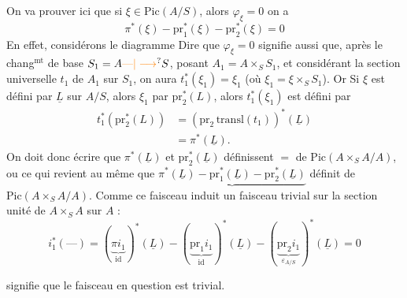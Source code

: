  On va prouver ici que si $\xi\in\mathrm{Pic}(A/S)$, alors $\varphi_\xi=0$  on a
\[
\pi^*(\xi)-\mathrm{pr}_1^*(\xi)-\mathrm{pr}_2^*(\xi)=0
\]
En effet, considérons le diagramme
Dire que $\varphi_\xi=0$ signifie aussi que, après le chang$^{\mathrm{mt}}$ de base   $S_1=A\unsure{\text{---}|\longrightarrow} S$, posant $A_1=A\times_S S_1$, et considérant la section universelle $t_1$ de $A_1$ sur $S_1$, on aura $t_1^*(\xi_1)=\xi_1$ (où $\xi_1=\xi\times_S S_1$).
Or  Si $\xi$ est défini par $\underline L$ sur $A/S$,  alors $\xi_1$ par $\mathrm{pr}_2^*(L)$, alors $t_1^*(\xi_1)$ est défini par
\[
\begin{aligned}
t_1^*(\mathrm{pr}_2^*(L))&=(\mathrm{pr}_2\,\mathrm{transl}(t_1))^*(\underline L)\\
&=\pi^*(\underline L).
\end{aligned}
\]
On doit donc  écrire que $\pi^*(\underline L)$ et $\mathrm{pr}_2^*(\underline L)$ définissent  $=$  de $\mathrm{Pic}(A\times_S A/A)$, ou ce qui revient au même que
$\underbrace{\pi^*(\underline L)-\mathrm{pr}_1^*(\underline L)-\mathrm{pr}_2^*(\underline L)}$ définit   \uline{} de $\mathrm{Pic}(A\times_S A/A)$. Comme ce faisceau induit un faisceau trivial sur la section unité de $A\times_S A$ sur $A$ :
\[
i_1^*(\text{---})=(\underbrace{\pi i_1}_{\mathrm{id}})^*(\underline L)-(\underbrace{\mathrm{pr}_1 i_1}_{\mathrm{id}})^*(\underline L)-(\underbrace{\mathrm{pr}_2 i_1}_{\varepsilon_{A/S}})^*(\underline L)=0
\]

 signifie que le faisceau en question est trivial.

